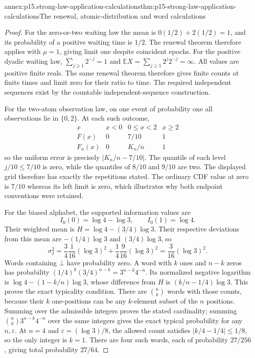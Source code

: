 \begin{annexitem}{annex:p15.strong-law-application-calculations}{thm:p15-strong-law-application-calculations}{The renewal, atomic-distribution and word calculations}
\begin{proof}
For the zero-or-two waiting law the mean is
\(0(1/2)+2(1/2)=1\), and its probability of a positive waiting
time is \(1/2\). The renewal theorem therefore applies with
\(\mu=1\), giving limit one despite coincident epochs.
For the positive dyadic waiting law,
\(\sum_{j\geq1}2^{-j}=1\) and
\(\mathbb EX=\sum_{j\geq1}2^j2^{-j}=\infty\).
All values are positive finite reals. The same renewal theorem
therefore gives finite counts at finite times and limit zero for
their ratio to time. The required independent sequences exist by
the countable independent-sequence construction.

For the two-atom observation law, on one event of probability one all
observations lie in \(\{0,2\}\). At each such outcome,
\[
 \begin{array}{c|ccc}
 x&x<0&0\leq x<2&x\geq2\\ \hline
 F(x)&0&7/10&1\\
 F_n(x)&0&K_n/n&1
 \end{array}
\]
so the uniform error is precisely \(|K_n/n-7/10|\).
The quantile of each level \(j/10\leq7/10\) is zero, while
the quantiles of \(8/10\) and \(9/10\) are two. The displayed
grid therefore has exactly the repetitions stated. The ordinary
CDF value at zero is \(7/10\) whereas its left limit is zero,
which illustrates why both endpoint conventions were retained.

For the biased alphabet, the supported information values are
\[
 I_0(0)=\log4-\log3,\qquad I_0(1)=\log4.
\]
Their weighted mean is \(H=\log4-(3/4)\log3\). Their respective
deviations from this mean are \(-(1/4)\log3\) and
\((3/4)\log3\), so
\[
 \sigma_I^2
   =\frac34\frac1{16}(\log3)^2
       +\frac14\frac9{16}(\log3)^2
   =\frac3{16}(\log3)^2.
\]
Words containing \(\bot\) have probability zero. A word with \(k\)
ones and \(n-k\) zeros has probability
\((1/4)^k(3/4)^{n-k}=3^{n-k}4^{-n}\).
Its normalized negative logarithm is
\(\log4-(1-k/n)\log3\), whose difference from \(H\) is
\((k/n-1/4)\log3\). This proves the exact typicality condition.
There are \(\binom nk\) words with those counts, because their
\(k\) one-positions can be any \(k\)-element subset of the \(n\)
positions. Summing over the admissible integers proves the stated
cardinality; summing
\(\binom nk3^{n-k}4^{-n}\) over the same integers gives the exact
typical probability for any \(n,\varepsilon\).
At \(n=4\) and \(\varepsilon=(\log3)/8\), the allowed count satisfies
\(|k/4-1/4|\leq1/8\), so the only integer is \(k=1\).
There are four such words, each of probability \(27/256\), giving
total probability \(27/64\).


\end{proof}
\end{annexitem}
